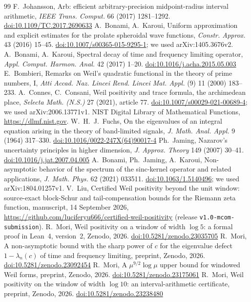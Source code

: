 \documentclass[11pt]{amsart}
\newcommand{\doi}[1]{\href{https://doi.org/#1}{doi:#1}}
\theoremstyle{remark}
\numberwithin{equation}{section}
\begin{document}
\begin{thebibliography}{99}
 F.~Johansson, Arb: efficient arbitrary-precision midpoint-radius interval arithmetic, \emph{IEEE Trans. Comput.} 66 (2017) 1281--1292. \doi{10.1109/TC.2017.2690633}
 A.~Bonami, A.~Karoui, Uniform approximation and explicit estimates for the prolate spheroidal wave functions, \emph{Constr. Approx.} 43 (2016) 15--45. \doi{10.1007/s00365-015-9295-1}; we used arXiv:1405.3676v2.
 A.~Bonami, A.~Karoui, Spectral decay of time and frequency limiting operator, \emph{Appl. Comput. Harmon. Anal.} 42 (2017) 1--20. \doi{10.1016/j.acha.2015.05.003}
 E.~Bombieri, Remarks on Weil's quadratic functional in the theory of prime numbers, I, \emph{Atti Accad. Naz. Lincei Rend. Lincei Mat. Appl.} (9) 11 (2000) 183--233.
 A.~Connes, C.~Consani, Weil positivity and trace formula, the archimedean place, \emph{Selecta Math. (N.S.)} 27 (2021), article 77. \doi{10.1007/s00029-021-00689-4}; we used arXiv:2006.13771v1.
 NIST Digital Library of Mathematical Functions, \url{https://dlmf.nist.gov}.
 W.~H.~J.~Fuchs, On the eigenvalues of an integral equation arising in the theory of band-limited signals, \emph{J. Math. Anal. Appl.} 9 (1964) 317--330. \doi{10.1016/0022-247X(64)90017-4}
 Ph.~Jaming, Nazarov's uncertainty principles in higher dimension, \emph{J. Approx. Theory} 149 (2007) 30--41. \doi{10.1016/j.jat.2007.04.005}
 A.~Bonami, Ph.~Jaming, A.~Karoui, Non-asymptotic behavior of the spectrum of the sinc-kernel operator and related applications, \emph{J. Math. Phys.} 62 (2021) 033511. \doi{10.1063/1.5140496}; we used arXiv:1804.01257v1.
 V.~Liu, Certified Weil positivity beyond the unit window: source-exact block-Schur and tail-compensation bounds for the Riemann zeta function, manuscript, 14 September 2026, \url{https://github.com/luciferyu666/certified-weil-positivity} (release \texttt{v1.0-mcom-submission}).
 R.~Mori, Weil positivity on a window of width $\log5$: a formal proof in Lean~4, version~2, Zenodo, 2026. \doi{10.5281/zenodo.23035705}
 R.~Mori, A non-asymptotic bound with the sharp power of $c$ for the eigenvalue defect $1-\lambda_n(c)$ of time and frequency limiting, preprint, Zenodo, 2026. \doi{10.5281/zenodo.23092454}
 R.~Mori, A $\mu^{9/2}\log\mu$ upper bound for windowed Weil forms, preprint, Zenodo, 2026. \doi{10.5281/zenodo.23175061}
 R.~Mori, Weil positivity on the window of width $\log10$: an interval-arithmetic certificate, preprint, Zenodo, 2026. \doi{10.5281/zenodo.23238480}

\end{thebibliography}
\end{document}
